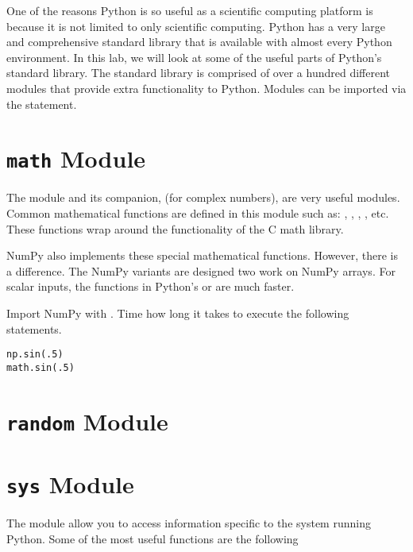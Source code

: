 
One of the reasons Python is so useful as a scientific computing platform is because
it is not limited to only scientific computing.  Python has a very large and comprehensive standard library that is available with almost every Python environment.
In this lab, we will look at some of the useful parts of Python's standard library.  The standard library is comprised of over a hundred different modules that provide extra functionality to Python.
Modules can be imported via the  statement.

\section*{\texttt{math} Module}
The  module and its companion,  (for complex numbers), are very useful modules.
Common mathematical functions are defined in this module such as: , , , , etc.  These functions wrap around the functionality of the C math library.

\begin{problem}
NumPy also implements these special mathematical functions.  However, there is a difference.
The NumPy variants are designed two work on NumPy arrays.  For scalar inputs, the functions
in Python's  or  are much faster.

Import NumPy with .  Time how long it takes to execute the following statements.
\begin{lstlisting}
np.sin(.5)
math.sin(.5)
\end{lstlisting}
\end{problem}

\section*{\texttt{random} Module}

\section*{\texttt{sys} Module}
The  module allow you to access information specific to the system running Python.  Some of the most useful functions are the following

